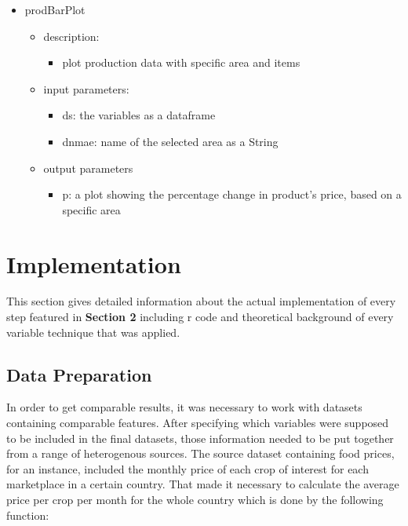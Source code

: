\documentclass[11pt]{article}
\begin{document}
\begin{itemize}
\item prodBarPlot   
	\begin{itemize}
	\item description: 
		\begin{itemize}
		\item plot production data with specific area and items
		\end{itemize}
	\item input parameters: 
		\begin{itemize}
		\item ds: the variables as a dataframe
		\item dnmae: name of the selected area as a String
		\end{itemize}
	\item output parameters
		\begin{itemize}
		\item p: a plot showing the percentage change in product's price, based on a specific area 
		\end{itemize}
	\end{itemize}



\end{itemize}


\newpage
\section{Implementation}

This section gives detailed information about the actual implementation of every step featured in \textbf{Section 2} including r code and theoretical background of every variable technique that was applied.



\subsection{Data Preparation}

In order to get comparable results, it was necessary to work with datasets containing comparable features. After specifying which variables were supposed to be included in the final datasets, those information needed to be put together from a range of heterogenous sources. 
The source dataset containing food prices, for an instance, included the monthly price of each crop of interest for each marketplace in a certain country. That made it necessary to calculate the average price per crop per month for the whole country which is done by the following function:
\end{document}
